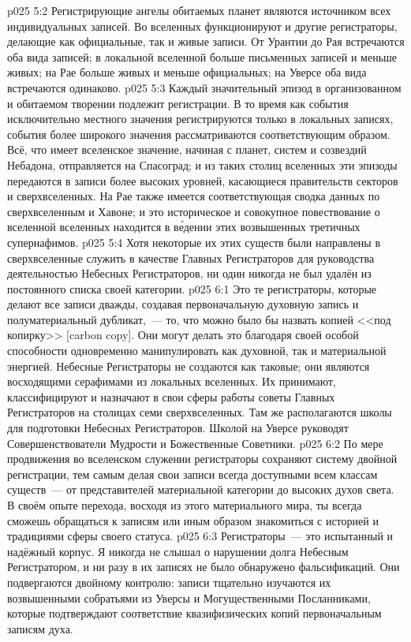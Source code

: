 \vs p025 5:2 Регистрирующие ангелы обитаемых планет являются источником всех индивидуальных записей. Во вселенных функционируют и другие регистраторы, делающие как официальные, так и живые записи. От Урантии до Рая встречаются оба вида записей; в локальной вселенной больше письменных записей и меньше живых; на Рае больше живых и меньше официальных; на Уверсе оба вида встречаются одинаково.
\vs p025 5:3 Каждый значительный эпизод в организованном и обитаемом творении подлежит регистрации. В то время как события исключительно местного значения регистрируются только в локальных записях, события более широкого значения рассматриваются соответствующим образом. Всё, что имеет вселенское значение, начиная с планет, систем и созвездий Небадона, отправляется на Спасоград; и из таких столиц вселенных эти эпизоды передаются в записи более высоких уровней, касающиеся правительств секторов и сверхвселенных. На Рае также имеется соответствующая сводка данных по сверхвселенным и Хавоне; и это историческое и совокупное повествование о вселенной вселенных находится в в\'едении этих возвышенных третичных супернафимов.
\vs p025 5:4 Хотя некоторые их этих существ были направлены в сверхвселенные служить в качестве Главных Регистраторов для руководства деятельностью Небесных Регистраторов, ни один никогда не был удалён из постоянного списка своей категории.
\vs p025 6:1 Это те регистраторы, которые делают все записи дважды, создавая первоначальную духовную запись и полуматериальный дубликат,~--- то, что можно было бы назвать копией <<под копирку>> [carbon copy]. Они могут делать это благодаря своей особой способности одновременно манипулировать как духовной, так и материальной энергией. Небесные Регистраторы не создаются как таковые; они являются восходящими серафимами из локальных вселенных. Их принимают, классифицируют и назначают в свои сферы работы советы Главных Регистраторов на столицах семи сверхвселенных. Там же располагаются школы для подготовки Небесных Регистраторов. Школой на Уверсе руководят Совершенствователи Мудрости и Божественные Советники.
\vs p025 6:2 По мере продвижения во вселенском служении регистраторы сохраняют систему двойной регистрации, тем самым делая свои записи всегда доступными всем классам существ~--- от представителей материальной категории до высоких духов света. В своём опыте перехода, восходя из этого материального мира, ты всегда сможешь обращаться к записям или иным образом знакомиться с историей и традициями сферы своего статуса.
\vs p025 6:3 Регистраторы~--- это испытанный и надёжный корпус. Я никогда не слышал о нарушении долга Небесным Регистратором, и ни разу в их записях не было обнаружено фальсификаций. Они подвергаются двойному контролю: записи тщательно изучаются их возвышенными собратьями из Уверсы и Могущественными Посланниками, которые подтверждают соответствие квазифизических копий первоначальным записям духа.
